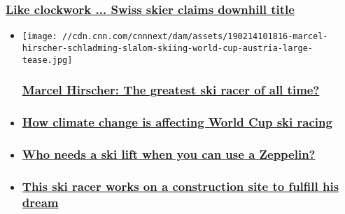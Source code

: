 \begin{itemize}
{  \subsubsection{\texorpdfstring{\href{/2019/03/13/sport/beat-feuz-skiing-world-cup-finals-andorra-spt-intl/index.html}{Like
  clockwork ... Swiss skier claims downhill
  title}}{Like clockwork ... Swiss skier claims downhill title}}\label{like-clockwork--swiss-skier-claims-downhill-title}}
\end{itemize}

\begin{itemize}
\item
  \href{/2019/02/14/sport/marcel-hirscher-profile-skiing-world-cup-world-championships-spt-intl/index.html}{}

  \texttt{[image: //cdn.cnn.com/cnnnext/dam/assets/190214101816-marcel-hirscher-schladming-slalom-skiing-world-cup-austria-large-tease.jpg]}

  \hypertarget{marcel-hirscher-the-greatest-ski-racer-of-all-time}{%
  \subsubsection{\texorpdfstring{\href{/2019/02/14/sport/marcel-hirscher-profile-skiing-world-cup-world-championships-spt-intl/index.html}{Marcel
  Hirscher: The greatest ski racer of all
  time?}}{Marcel Hirscher: The greatest ski racer of all time?}}\label{marcel-hirscher-the-greatest-ski-racer-of-all-time}}
\item
  \hypertarget{how-climate-change-is-affecting-world-cup-ski-racing}{%
  \subsubsection{\texorpdfstring{\href{/2019/03/22/sport/skiing-climate-change-world-cup-season-spt-intl/index.html}{How
  climate change is affecting World Cup ski
  racing}}{How climate change is affecting World Cup ski racing}}\label{how-climate-change-is-affecting-world-cup-ski-racing}}
\item
  \hypertarget{who-needs-a-ski-lift-when-you-can-use-a-zeppelin}{%
  \subsubsection{\texorpdfstring{\href{/2019/03/18/sport/zeppelin-skiing-austria-alps-spt-intl/index.html}{Who
  needs a ski lift when you can use a
  Zeppelin?}}{Who needs a ski lift when you can use a Zeppelin?}}\label{who-needs-a-ski-lift-when-you-can-use-a-zeppelin}}
\item
  \hypertarget{this-ski-racer-works-on-a-construction-site-to-fulfill-his-dream}{%
  \subsubsection{\texorpdfstring{\href{/2019/03/21/sport/harry-laidlaw-dries-van-den-brocke-global-racing-alpine-skiing-spt-int/index.html}{This
  ski racer works on a construction site to fulfill his
  dream}}{This ski racer works on a construction site to fulfill his dream}}\label{this-ski-racer-works-on-a-construction-site-to-fulfill-his-dream}}
\end{itemize}

